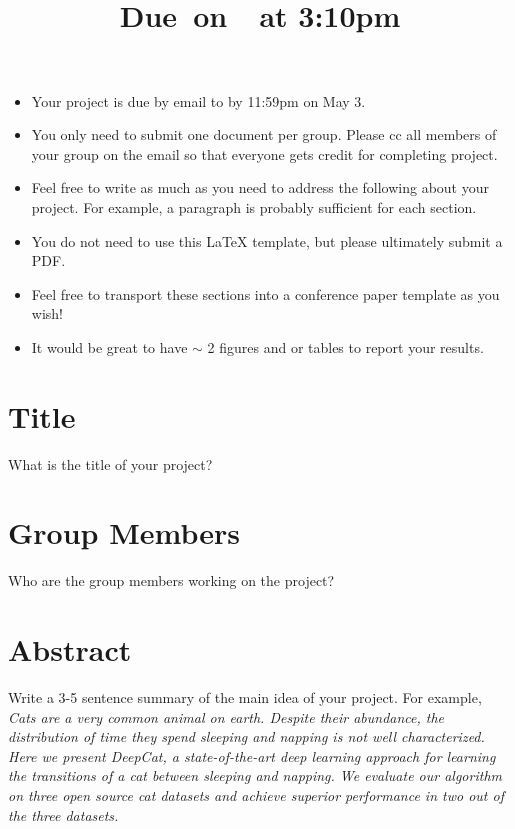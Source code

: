 \documentclass{article}
\title{
    \vspace{2in}
    \textmd{\textbf{\hmwkClass\hmwkTitle}}\\
    \normalsize\vspace{0.1in}\small{Due\ on\ \hmwkDueDate\ at 3:10pm}\\
    \vspace{3in}
}
\author{\hmwkAuthorName}
\date{}
\begin{document}

\begin{itemize}
\item Your project is due by email to  by 11:59pm on May 3. 
\item You only need to submit one document per group. Please cc all members of your group on the email so that everyone gets credit for completing project.  
\item Feel free to write as much as you need to address the following about your project. For example, a paragraph is probably sufficient for each section. 
\item You do not need to use this LaTeX template, but please ultimately submit a PDF. 
\item Feel free to transport these sections into a conference paper template as you wish!
\item It would be great to have $\sim$ 2 figures and or tables to report your results. 
\end{itemize}

\section{Title}

What is the title of your project?

\section{Group Members}

Who are the group members working on the project? 

\section{Abstract}

Write a 3-5 sentence summary of the main idea of your project. For example, \\

\emph{Cats are a very common animal on earth. Despite their abundance, the distribution of time they spend sleeping and napping is not well characterized. Here we present DeepCat, a state-of-the-art deep learning approach for learning the transitions of a cat between sleeping and napping. We evaluate our algorithm on three open source cat datasets and achieve superior performance in two out of the three datasets.}
\end{document}
